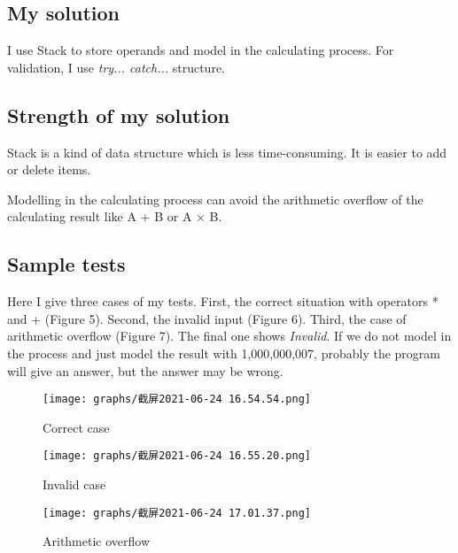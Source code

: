 \documentclass{article}
\begin{document}
    \subsection{My solution}
    I use Stack to store operands and model in the calculating process. For validation, I use \textit{try... catch...} structure. 

    \subsection{Strength of my solution}
    Stack is a kind of data structure which is less time-consuming. It is easier to add or delete items.\par 
    Modelling in the calculating process can avoid the arithmetic overflow of the calculating result like A + B or A × B.

    \subsection{Sample tests}
    Here I give three cases of my tests. First, the correct situation with operators * and + (Figure 5). Second, the invalid input (Figure 6). Third, the case of arithmetic overflow (Figure 7). The final one shows \textit{Invalid}. If we do not model in the process and just model the result with 1,000,000,007, probably the program will give an answer, but the answer may be wrong. 

    \begin{figure}[h]
      \begin{minipage}{0.5\linewidth}
        \centering
        \texttt{[image: graphs/截屏2021-06-24 16.54.54.png]}
        \caption{Correct case}
      \end{minipage}
      \begin{minipage}{0.5\linewidth}
        \centering
        \texttt{[image: graphs/截屏2021-06-24 16.55.20.png]}
        \caption{Invalid case}
      \end{minipage}
    \end{figure}

      \begin{figure}[h]
        \centering
        \texttt{[image: graphs/截屏2021-06-24 17.01.37.png]}
        \caption{Arithmetic overflow}
      \end{figure}
\end{document}
